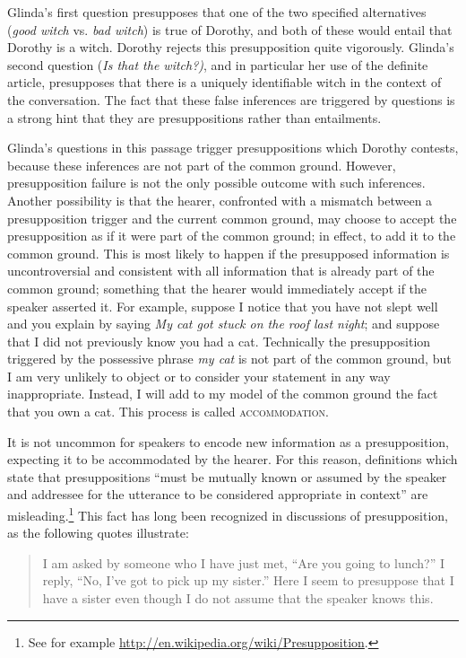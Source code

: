 Glinda’s first question presupposes that one of the two specified alternatives (\textit{good witch} vs. \textit{bad witch}) is true of Dorothy, and both of these would entail that Dorothy is a witch. Dorothy rejects this presupposition quite vigorously. Glinda’s second question (\textit{Is that the witch?)}, and in particular her use of the definite article, presupposes that there is a uniquely identifiable witch in the context of the conversation. The fact that these false inferences are triggered by questions is a strong hint that they are presuppositions rather than entailments.



Glinda’s questions in this passage trigger presuppositions which Dorothy contests, because these inferences are not part of the common ground. However, presupposition failure is not the only possible outcome with such inferences. Another possibility is that the hearer, confronted with a mismatch between a presupposition trigger and the current common ground, may choose to accept the presupposition as if it were part of the common ground; in effect, to add it to the common ground. This is most likely to happen if the presupposed information is uncontroversial and consistent with all information that is already part of the common ground; something that the hearer would immediately accept if the speaker asserted it. For example, suppose I notice that you have not slept well and you explain by saying \textit{My cat got stuck on the roof last night}; and suppose that I did not previously know you had a cat. Technically the presupposition triggered by the possessive phrase \textit{my cat} is not part of the common ground, but I am very unlikely to object or to consider your statement in any way inappropriate. Instead, I will add to my model of the common ground the fact that you own a cat. This process is called \textsc{accommodation}.



It is not uncommon for speakers to encode new information as a presupposition, expecting it to be accommodated by the hearer. For this reason, definitions which state that presuppositions “must be mutually known or assumed by the speaker and addressee for the utterance to be considered appropriate in context” are misleading.\footnote{See for example \url{http://en.wikipedia.org/wiki/Presupposition}.} This fact has long been recognized in discussions of presupposition, as the following quotes illustrate:


\begin{quote}
I am asked by someone who I have just met, ``Are you going to lunch?'' I reply, ``No, I’ve got to pick up my sister.'' Here I seem to presuppose that I have a sister even though I do not assume that the speaker knows this. \citep[202]{Stalnaker1974} 
\end{quote}


